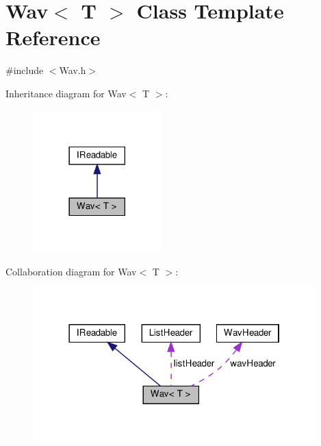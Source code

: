 \hypertarget{classWav}{}\section{Wav$<$ T $>$ Class Template Reference}
\label{classWav}


{\ttfamily \#include $<$Wav.\+h$>$}



Inheritance diagram for Wav$<$ T $>$\+:
\nopagebreak
\begin{figure}[H]
\begin{center}
\leavevmode
\includegraphics[width=141pt]{d1/d86/classWav__inherit__graph}
\end{center}
\end{figure}


Collaboration diagram for Wav$<$ T $>$\+:
\nopagebreak
\begin{figure}[H]
\begin{center}
\leavevmode
\includegraphics[width=310pt]{db/dac/classWav__coll__graph}
\end{center}
\end{figure}
